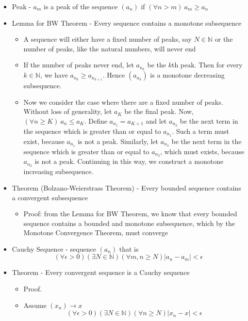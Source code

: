 \documentclass{article}
\begin{document}
\begin{itemize}
\begin{itemize}
    \end{itemize}
    \item Peak - $a_m$ is a peak of the sequence $(a_n)$ if $(\forall n > m) \ a_m \ge a_n$
    \item Lemma for BW Theorem - Every sequence contains a monotone subsequence
    \begin{itemize}
        \item A sequence will either have a fixed number of peaks, say $N \in \mathbb{N}$ or the number of peaks, like the natural numbers, will never end
        \item If the number of peaks never end, let $a_{n_k}$ be the $k$th peak. Then for every $k \in \mathbb{N}$, we have $a_{n_k} \ge a_{n_{k+1}}$. Hence $(a_{n_k})$ is a monotone decreasing subsequence.
        \item Now we consider the case where there are a fixed number of peaks. Without loss of generality, let $a_K$ be the final peak. Now, $(\forall n \ge K) \ a_n \le a_K$. Define $a_{n_1} = a_{K+1}$ and let $a_{n_2}$ be the next term in the sequence which is greater than or equal to $a_{n_1}$. Such a term must exist, because $a_{n_1}$ is not a peak. Similarly, let $a_{n_3}$ be the next term in the sequence which is greater than or equal to $a_{n_2}$, which must exists, because $a_{n_2}$ is not a peak. Continuing in this way, we construct a monotone increasing subsequence.
    \end{itemize}
    \item Theorem (Bolzano-Weierstrass Theorem) - Every bounded sequence contains a convergent subsequence
    \begin{itemize}
        \item Proof: from the Lemma for BW Theorem, we know that every bounded sequence contains a bounded and monotone subsequence, which by the Monotone Convergence Theorem, must converge
    \end{itemize}
    \item Cauchy Sequence - sequence $(a_n)$ that is
    \[
    (\forall \epsilon > 0)(\exists N \in \mathbb{N})(\forall m,n \ge N) \vert a_n - a_m \vert < \epsilon
    \]
    \item Theorem - Every convergent sequence is a Cauchy sequence
    \begin{itemize}
        \item Proof.
        \item Assume $(x_n) \rightarrow x$
        \[ (\forall \epsilon > 0)(\exists N \in \mathbb{N})(\forall n \ge N) \vert x_n - x \vert < \epsilon \]

\end{itemize}
\end{itemize}
\end{document}
